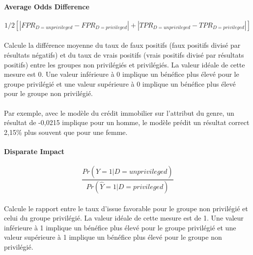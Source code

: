 \documentclass[10pt, french, a4paper]{report}
\begin{document}
\paragraph{Average Odds Difference}

\begin{equation}\label{eq:ave_odds_diff}
  1/2 [|FPR_{D = unprivileged} - FPR_{D = privileged}| + |TPR_{D = unprivileged} - TPR_{D = privileged}|]
\end{equation}

\paragraph{}
Calcule la différence moyenne du taux de faux positifs (faux positifs divisé par résultats négatifs) et du taux de vrais positifs (vrais positifs divisé par résultats positifs) entre les groupes non privilégiés et privilégiés. La valeur idéale de cette mesure est 0. Une valeur inférieure à 0 implique un bénéfice plus élevé pour le groupe privilégié et une valeur supérieure à 0 implique un bénéfice plus élevé pour le groupe non privilégié.

\paragraph{}
Par exemple, avec le modèle du crédit immobilier sur l'attribut du genre, un résultat de -0,0215 implique pour un homme, le modèle prédit un résultat correct 2,15\%  plus souvent que pour une femme.

\paragraph{Disparate Impact}

\begin{equation}\label{eq:disp_impact}
  \frac{Pr(\hat{Y} = 1 | D = unprivileged)}{Pr(\hat{Y} = 1 | D = privileged)}
\end{equation}

\paragraph{}
Calcule le rapport entre le taux d'issue favorable pour le groupe non privilégié et celui du groupe privilégié. La valeur idéale de cette mesure est de 1. Une valeur inférieure à 1 implique un bénéfice plus élevé pour le groupe privilégié et une valeur supérieure à 1 implique un bénéfice plus élevé pour le groupe non privilégié.
\end{document}
